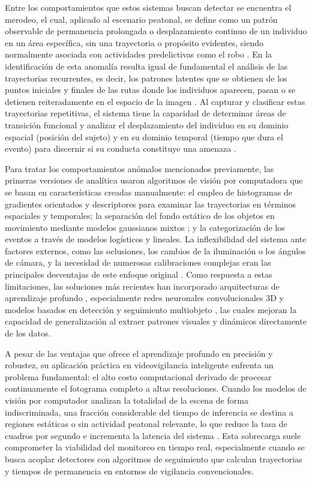 \documentclass[runningheads]{llncs}
\begin{document}
Entre los comportamientos que estos sistemas buscan detectar se encuentra el merodeo, el cual, aplicado al escenario peatonal, se define como un patrón observable de permanencia prolongada o desplazamiento continuo de un individuo en un área específica, sin una trayectoria o propósito evidentes, siendo normalmente asociada con actividades predelictivas como el robo  \cite{mehmood2021,wahyono2023,waddenkery2024}. En la identificación de esta anomalía resulta igual de fundamental el análisis de las trayectorias recurrentes, es decir, los patrones latentes que se obtienen de los puntos iniciales y finales de las rutas donde los individuos aparecen, pasan o se detienen reiteradamente en el espacio de la imagen \cite{cho2025,jeoung2026}. Al capturar y clasificar estas trayectorias repetitivas, el sistema tiene la capacidad de determinar áreas de transición funcional y analizar el desplazamiento del individuo en su dominio espacial (posición del sujeto) y en su dominio temporal (tiempo que dura el evento) para discernir si su conducta constituye una amenaza \cite{jeoung2026,wahyono2023}. 

Para tratar los comportamientos anómalos mencionados previamente, las primeras versiones de analítica usaron algoritmos de visión por computadora que se basan en características creadas manualmente: el empleo de histogramas de gradientes orientados y descriptores para examinar las trayectorias en términos espaciales y temporales; la separación del fondo estático de los objetos en movimiento mediante modelos gaussianos mixtos \cite{mehmood2021,wahyono2023,waddenkery2024}; y la categorización de los eventos a través de modelos logísticos y lineales. La inflexibilidad del sistema ante factores externos, como las oclusiones, los cambios de la iluminación o los ángulos de cámara, y la necesidad de numerosas calibraciones complejas eran las principales desventajas de este enfoque original \cite{choudhry2023,waddenkery2024}. Como respuesta a estas limitaciones, las soluciones más recientes han incorporado arquitecturas de aprendizaje profundo \cite{mehmood2021}, especialmente redes neuronales convolucionales 3D y modelos basados en detección y seguimiento multiobjeto \cite{choudhry2023,wahyono2023}, las cuales mejoran la capacidad de generalización al extraer patrones visuales y dinámicos directamente de los datos.

A pesar de las ventajas que ofrece el aprendizaje profundo en precisión y robustez, su aplicación práctica en videovigilancia inteligente enfrenta un problema fundamental: el alto costo computacional derivado de procesar continuamente el fotograma completo a altas resoluciones. Cuando los modelos de visión por computador analizan la totalidad de la escena de forma indiscriminada, una fracción considerable del tiempo de inferencia se destina a regiones estáticas o sin actividad peatonal relevante, lo que reduce la tasa de cuadros por segundo e incrementa la latencia del sistema \cite{choudhry2023,nayak2019}. Esta sobrecarga suele comprometer la viabilidad del monitoreo en tiempo real, especialmente cuando se busca acoplar detectores con algoritmos de seguimiento que calculan trayectorias y tiempos de permanencia en entornos de vigilancia convencionales.
\end{document}
